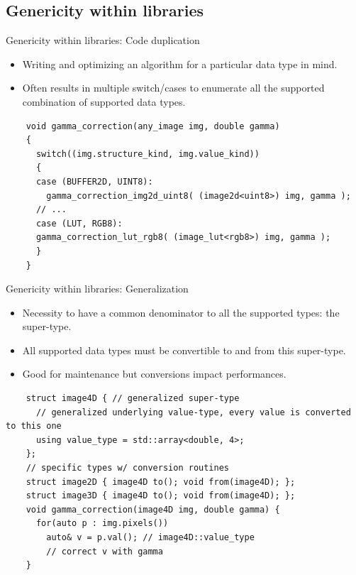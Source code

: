 \documentclass[12pt,aspectratio=169]{beamer}
\begin{document}
\subsection[Genericity within libraries]{Genericity within libraries}

\begin{frame}[fragile]{Genericity within libraries: Code duplication}
  \begin{itemize}
    \item Writing and optimizing an algorithm for a particular data type in mind.
    \item Often results in multiple switch/cases to enumerate all the supported combination of supported data types.
  \end{itemize}
  \begin{verbatim}
    void gamma_correction(any_image img, double gamma)
    {
      switch((img.structure_kind, img.value_kind)) 
      {
      case (BUFFER2D, UINT8):
        gamma_correction_img2d_uint8( (image2d<uint8>) img, gamma );
      // ...
      case (LUT, RGB8):
      gamma_correction_lut_rgb8( (image_lut<rgb8>) img, gamma );
      }
    }
  \end{verbatim}
\end{frame}

\begin{frame}[fragile]{Genericity within libraries: Generalization}
  \begin{itemize}
    \item Necessity to have a common denominator to all the supported types: the super-type.
    \item All supported data types must be convertible to and from this super-type.
    \item Good for maintenance but conversions impact performances.
  \end{itemize}
  \begin{verbatim}
    struct image4D { // generalized super-type
      // generalized underlying value-type, every value is converted to this one
      using value_type = std::array<double, 4>;
    };
    // specific types w/ conversion routines
    struct image2D { image4D to(); void from(image4D); };
    struct image3D { image4D to(); void from(image4D); };
    void gamma_correction(image4D img, double gamma) {
      for(auto p : img.pixels())
        auto& v = p.val(); // image4D::value_type
        // correct v with gamma
    }
  \end{verbatim}
\end{frame}
\end{document}

